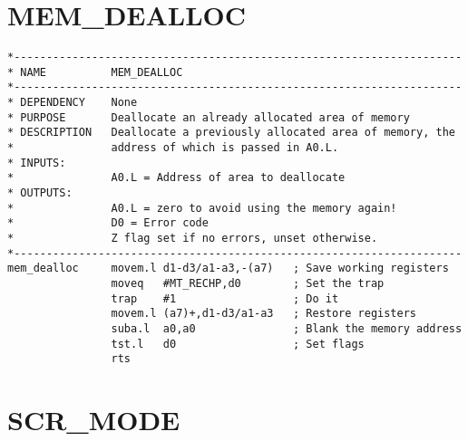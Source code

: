 \section{MEM\_DEALLOC}
\label{ch9-MEM_DEALLOC}%

\begin{lstlisting}[firstnumber=1,caption={MEM\_DEALLOC}]
*---------------------------------------------------------------------
* NAME          MEM_DEALLOC
*---------------------------------------------------------------------
* DEPENDENCY    None
* PURPOSE       Deallocate an already allocated area of memory
* DESCRIPTION   Deallocate a previously allocated area of memory, the 
*               address of which is passed in A0.L.
* INPUTS:
*               A0.L = Address of area to deallocate
* OUTPUTS:
*               A0.L = zero to avoid using the memory again!
*               D0 = Error code
*               Z flag set if no errors, unset otherwise.
*---------------------------------------------------------------------
mem_dealloc     movem.l d1-d3/a1-a3,-(a7)   ; Save working registers
                moveq   #MT_RECHP,d0        ; Set the trap
                trap    #1                  ; Do it
                movem.l (a7)+,d1-d3/a1-a3   ; Restore registers
                suba.l  a0,a0               ; Blank the memory address
                tst.l   d0                  ; Set flags
                rts
\end{lstlisting}

\section{SCR\_MODE}
\label{ch9-SCR_MODE}%

